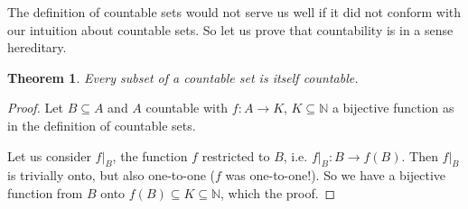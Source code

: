 \documentclass[12pt]{article}
\newtheorem{thm}{Theorem}
\begin{document}
The definition of countable sets would not serve us well if it did not conform with our intuition about countable sets. So let us prove that countability is in a sense hereditary.
\begin{thm}  Every subset of a countable set is itself countable. \end{thm}
\begin{proof}
Let $B\subseteq A$ and $A$ countable with $f:A\rightarrow K$, $K\subseteq \mathbb{N}$ a bijective function as in the definition of countable sets.

Let us consider $f|_B$, the function  $f$ restricted to $B$, i.e. $f|_B: B \rightarrow f(B)$. Then $f|_B$ is trivially onto, but also one-to-one ($f$ was one-to-one!). So we have a bijective function from $B$ onto $f(B)\subseteq K \subseteq \mathbb{N}$, which  the proof.
\end{proof}
\end{document}
